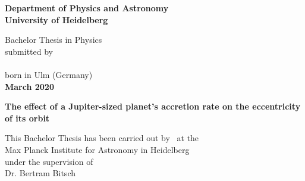 
\begin{titlepage}
  \begin{center}
     
    \Large\textbf{
      Department of Physics and Astronomy\\
      University of Heidelberg
    }
    
    \vspace{18cm}
    
    \normalsize
    Bachelor Thesis in Physics\\
    submitted by\\
    \vspace{0.5cm}
    \Large\textbf{\theauthor}\\
    \normalsize
    \vspace{0.5cm}
    born in Ulm (Germany)\\
    \vspace{0.5cm}
    \Large\textbf{March 2020}
    \normalsize
    
    \newpage\null\thispagestyle{empty}\newpage
    
    \Large\textbf{
      The effect of a Jupiter-sized planet's accretion rate on the
      eccentricity of its orbit
    }
    
    \vspace{18cm}
    
    \normalsize
    This Bachelor Thesis has been carried out by \theauthor\ at the\\
    Max Planck Institute for Astronomy in Heidelberg\\
    under the supervision of\\
    Dr. Bertram Bitsch
    
    \vfill
  \end{center}

\end{titlepage}

